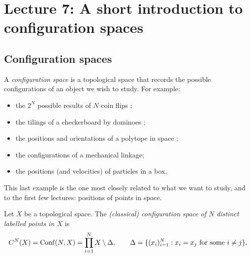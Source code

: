 
\chapter{Lecture 7: A short introduction to configuration spaces}
\label{L07:ch:lecture7}

\section{Configuration spaces}
\label{L07:sec:confspaces}

A \emph{configuration space} is a topological space that records the possible
configurations of an object we wish to study. For example:
\begin{itemize}
  \item the $2^N$ possible results of $N$ coin flips
    ;
  \item the tilings of a checkerboard by dominoes ;
  \item the positions and orientations of a polytope in space
    ;
  \item the configurations of a mechanical linkage;
  \item the positions (and velocities) of particles in a box.
\end{itemize}

This last example is the one most closely related to what we want to study, and to the
first few lectures: positions of points in space.

\begin{definition}
\label{L07:def:conf}
Let $X$ be a topological space. The \emph{(classical) configuration space of $N$
distinct labelled points in $X$} is
\[
  C^N(X) = \operatorname{Conf}(N,X) = \prod_{i=1}^N X \setminus \Delta,
  \qquad
  \Delta = \{(x_i)_{i=1}^N : x_i = x_j \text{ for some } i\neq j\},
\]
\end{definition}

